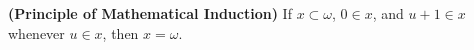 \textbf{(Principle of Mathematical Induction)} If $x \subset \omega$, $0 \in x$, and $u + 1 \in x$ whenever $u \in x$, then $x = \omega$.
